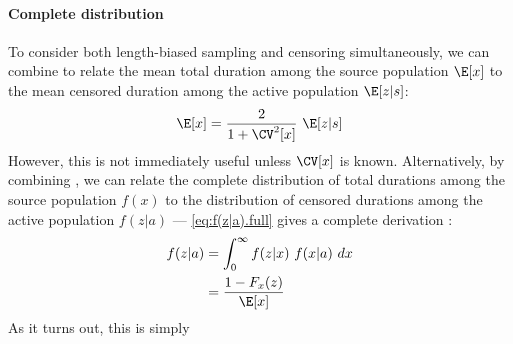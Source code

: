 \paragraph{Complete distribution}
To consider both length-biased sampling and censoring simultaneously,
we can combine  to relate
the mean total duration among the source population $\E[x]$ to
the mean censored duration among the active population $\E[z|s]$:
\begin{equation}
  \E[x] = \frac{2}{1 + \CV^2[x]} ~ \E[z|s]
  \label{eq:E[x].cv}
\end{equation}
However, this is not immediately useful unless $\CV[x]$ is known.
Alternatively, by combining , we can relate
the complete distribution of total durations among the source population $f(x)$ to
the distribution of censored durations among the active population $f(z|a)$
--- \eqref{eq:f(z|a).full} gives a complete derivation \cite{Tufto2017}:
\begin{equation}
  \begin{aligned}
    f(z|a) &= \int_0^\infty f(z|x) ~ f(x|a) ~ dx \\
           &= \frac{1 - F_x(z)}{\E[x]}
  \end{aligned}
  \label{eq:f(z|a)}
\end{equation}
As it turns out, this is simply
